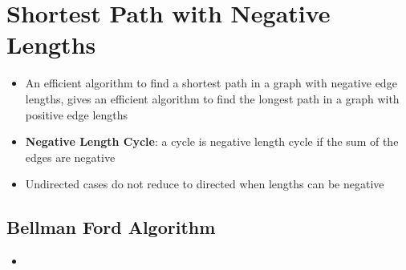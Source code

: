 \section{Shortest Path with Negative Lengths}

\begin{itemize}
  \item An efficient algorithm to find a shortest path in a graph with
  negative edge lengths, gives an efficient algorithm to find the longest
  path in a graph with positive edge lengths
  \item \textbf{Negative Length Cycle}: a cycle is negative length cycle
  if the sum of the edges are negative
  \item Undirected cases do not reduce to directed when lengths can be negative
\end{itemize}

\subsection{Bellman Ford Algorithm}

  \begin{itemize}
    \item
  \end{itemize}
